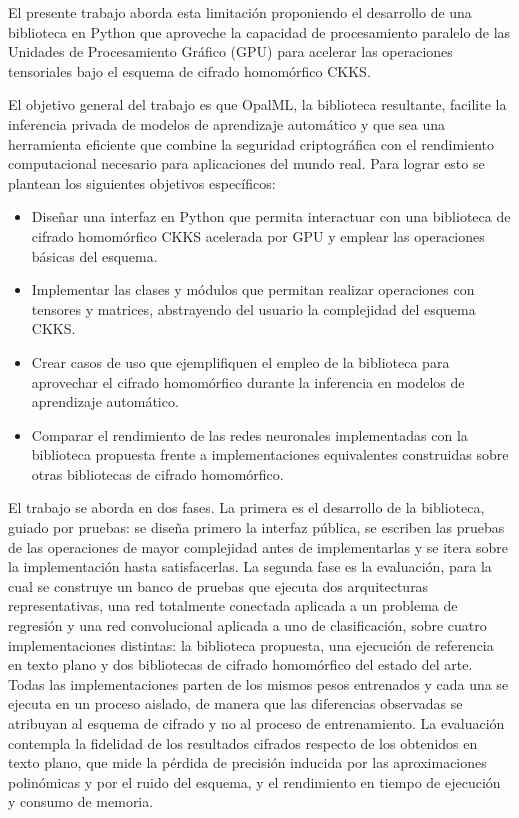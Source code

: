 El presente trabajo aborda esta limitación proponiendo el desarrollo de una biblioteca en Python que aproveche la capacidad de procesamiento paralelo de las Unidades de Procesamiento Gráfico (GPU) para acelerar las operaciones tensoriales bajo el esquema de cifrado homomórfico CKKS.

El objetivo general del trabajo es que OpalML, la biblioteca resultante, facilite la inferencia privada de modelos de aprendizaje automático y que sea una herramienta eficiente que combine la seguridad criptográfica con el rendimiento computacional necesario para aplicaciones del mundo real. Para lograr esto se plantean los siguientes objetivos específicos:

\begin{itemize}
   \item Diseñar una interfaz en Python que permita interactuar con una biblioteca de cifrado homomórfico CKKS acelerada por GPU y emplear las operaciones básicas del esquema.
   \item Implementar las clases y módulos que permitan realizar operaciones con tensores y matrices, abstrayendo del usuario la complejidad del esquema CKKS.
   \item Crear casos de uso que ejemplifiquen el empleo de la biblioteca para aprovechar el cifrado homomórfico durante la inferencia en modelos de aprendizaje automático.
   \item Comparar el rendimiento de las redes neuronales implementadas con la biblioteca propuesta frente a implementaciones equivalentes construidas sobre otras bibliotecas de cifrado homomórfico.
\end{itemize}

El trabajo se aborda en dos fases. La primera es el desarrollo de la biblioteca, guiado por pruebas: se diseña primero la interfaz pública, se escriben las pruebas de las operaciones de mayor complejidad antes de implementarlas y se itera sobre la implementación hasta satisfacerlas. La segunda fase es la evaluación, para la cual se construye un banco de pruebas que ejecuta dos arquitecturas representativas, una red totalmente conectada aplicada a un problema de regresión y una red convolucional aplicada a uno de clasificación, sobre cuatro implementaciones distintas: la biblioteca propuesta, una ejecución de referencia en texto plano y dos bibliotecas de cifrado homomórfico del estado del arte. Todas las implementaciones parten de los mismos pesos entrenados y cada una se ejecuta en un proceso aislado, de manera que las diferencias observadas se atribuyan al esquema de cifrado y no al proceso de entrenamiento. La evaluación contempla la fidelidad de los resultados cifrados respecto de los obtenidos en texto plano, que mide la pérdida de precisión inducida por las aproximaciones polinómicas y por el ruido del esquema, y el rendimiento en tiempo de ejecución y consumo de memoria.

